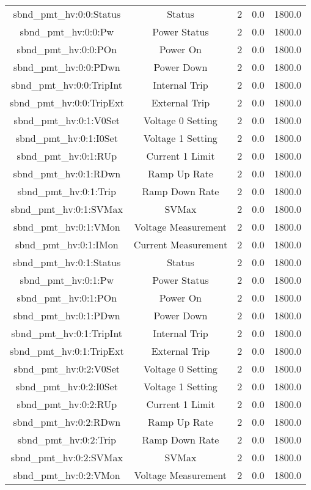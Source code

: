 \begin{table}[ptb]
\begin{tabular}{c | c c c c}
sbnd_pmt_hv:0:0:Status & Status & 2 & 0.0 & 1800.0\\ 
sbnd_pmt_hv:0:0:Pw & Power Status & 2 & 0.0 & 1800.0\\ 
sbnd_pmt_hv:0:0:POn & Power On & 2 & 0.0 & 1800.0\\ 
sbnd_pmt_hv:0:0:PDwn & Power Down & 2 & 0.0 & 1800.0\\ 
sbnd_pmt_hv:0:0:TripInt & Internal Trip & 2 & 0.0 & 1800.0\\ 
sbnd_pmt_hv:0:0:TripExt & External Trip & 2 & 0.0 & 1800.0\\ 
sbnd_pmt_hv:0:1:V0Set & Voltage 0 Setting & 2 & 0.0 & 1800.0\\ 
sbnd_pmt_hv:0:1:I0Set & Voltage 1 Setting & 2 & 0.0 & 1800.0\\ 
sbnd_pmt_hv:0:1:RUp & Current 1 Limit & 2 & 0.0 & 1800.0\\ 
sbnd_pmt_hv:0:1:RDwn & Ramp Up Rate & 2 & 0.0 & 1800.0\\ 
sbnd_pmt_hv:0:1:Trip & Ramp Down Rate & 2 & 0.0 & 1800.0\\ 
sbnd_pmt_hv:0:1:SVMax & SVMax & 2 & 0.0 & 1800.0\\ 
sbnd_pmt_hv:0:1:VMon & Voltage Measurement & 2 & 0.0 & 1800.0\\ 
sbnd_pmt_hv:0:1:IMon & Current Measurement & 2 & 0.0 & 1800.0\\ 
sbnd_pmt_hv:0:1:Status & Status & 2 & 0.0 & 1800.0\\ 
sbnd_pmt_hv:0:1:Pw & Power Status & 2 & 0.0 & 1800.0\\ 
sbnd_pmt_hv:0:1:POn & Power On & 2 & 0.0 & 1800.0\\ 
sbnd_pmt_hv:0:1:PDwn & Power Down & 2 & 0.0 & 1800.0\\ 
sbnd_pmt_hv:0:1:TripInt & Internal Trip & 2 & 0.0 & 1800.0\\ 
sbnd_pmt_hv:0:1:TripExt & External Trip & 2 & 0.0 & 1800.0\\ 
sbnd_pmt_hv:0:2:V0Set & Voltage 0 Setting & 2 & 0.0 & 1800.0\\ 
sbnd_pmt_hv:0:2:I0Set & Voltage 1 Setting & 2 & 0.0 & 1800.0\\ 
sbnd_pmt_hv:0:2:RUp & Current 1 Limit & 2 & 0.0 & 1800.0\\ 
sbnd_pmt_hv:0:2:RDwn & Ramp Up Rate & 2 & 0.0 & 1800.0\\ 
sbnd_pmt_hv:0:2:Trip & Ramp Down Rate & 2 & 0.0 & 1800.0\\ 
sbnd_pmt_hv:0:2:SVMax & SVMax & 2 & 0.0 & 1800.0\\ 
sbnd_pmt_hv:0:2:VMon & Voltage Measurement & 2 & 0.0 & 1800.0\\ 

\end{tabular}
\end{table}
